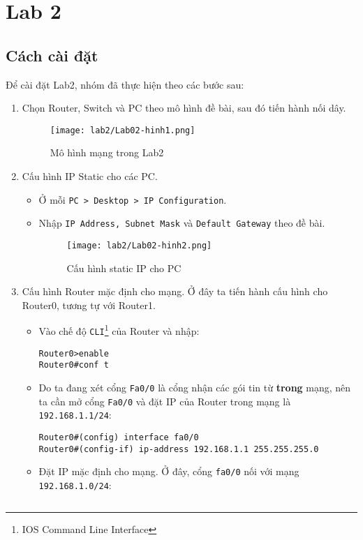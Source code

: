 \documentclass[]{article}
\begin{document}
\section{Lab 2}
\subsection{Cách cài đặt}
Để cài đặt Lab2, nhóm đã thực hiện theo các bước sau:
\begin{enumerate}
\item Chọn Router, Switch và PC theo mô hình đề bài, sau đó tiến hành nối dây.
\begin{figure}[H]
    \centering
    \texttt{[image: lab2/Lab02-hinh1.png]}
    \caption{Mô hình mạng trong Lab2}
    \label{fig:MohinhLab2}
\end{figure}
\item Cấu hình IP Static cho các PC.
\begin{itemize}
    \item Ở mỗi \texttt{PC > Desktop > IP Configuration}.
    \item Nhập \texttt{IP Address, Subnet Mask} và \texttt{Default Gateway} theo đề bài.
    \begin{figure}[H]
        \centering
        \texttt{[image: lab2/Lab02-hinh2.png]}
        \caption{Cấu hình static IP cho PC}
    \end{figure}
\end{itemize}
\item Cấu hình Router mặc định cho mạng.
Ở đây ta tiến hành cấu hình cho Router0, tương tự với Router1.\label{chRouter}
\begin{itemize}
\item Vào chế độ \texttt{CLI}\footnote{IOS Command Line Interface} của Router và nhập:
\begin{lstlisting}
Router0>enable
Router0#conf t
\end{lstlisting}
\item Do ta đang xét cổng \texttt{Fa0/0} là cổng nhận các gói tin từ \textbf{trong} mạng, nên ta cần mở cổng \texttt{Fa0/0} và đặt IP của Router trong mạng là \texttt{192.168.1.1/24}:
\begin{lstlisting}
Router0#(config) interface fa0/0
Router0#(config-if) ip-address 192.168.1.1 255.255.255.0
\end{lstlisting}
\item Đặt IP mặc định cho mạng. Ở đây, cổng \texttt{fa0/0} nối với mạng \texttt{192.168.1.0/24}:
\begin{lstlisting}

\end{lstlisting}
\end{itemize}
\end{enumerate}
\end{document}

